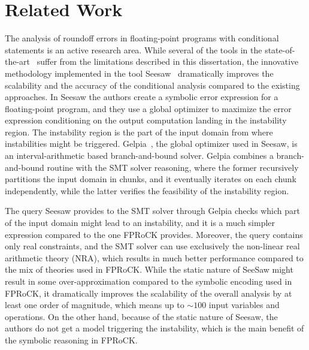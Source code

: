 \chapter{Related Work}
\setupuuchapterbib
%
The analysis of roundoff errors in floating-point programs with conditional statements is an active research area.
%
While several of the tools in the state-of-the-art~\cite{darulova2018daisy, precisa, fluctuat} suffer from the limitations described in this dissertation, the innovative methodology implemented in the tool Seesaw~\cite{seesaw} dramatically improves the scalability and the accuracy of the conditional analysis compared to the existing approaches.
%
In Seesaw the authors create a symbolic error expression for a floating-point program, and they use a global optimizer to maximize the error expression conditioning on the output computation landing in the instability region.
%
The instability region is the part of the input domain from where instabilities might be triggered.
%
Gelpia~\cite{gelpia}, the global optimizer used in Seesaw, is an interval-arithmetic based branch-and-bound solver. 
%
Gelpia combines a branch-and-bound routine with the SMT solver reasoning, where the former recursively partitions the input domain in chunks, and it eventually iterates on each chunk independently, while the latter verifies the feasibility of the instability region. 
%

The query Seesaw provides to the SMT solver through Gelpia checks which part of the input domain might lead to an instability, and it is a much simpler expression compared to the one FPRoCK provides.
%
Moreover, the query contains only real constraints, and the SMT solver can use exclusively the non-linear real arithmetic theory (NRA), which results in much better performance compared to the mix of theories used in FPRoCK.
%
While the static nature of SeeSaw might result in some over-approximation compared to the symbolic encoding used in FPRoCK, it dramatically improves the scalability of the overall analysis by at least one order of magnitude, which means up to $\sim100$ input variables and operations.
%
On the other hand, because of the static nature of Seesaw, the authors do not get a model triggering the instability, which is the main benefit of the symbolic reasoning in FPRoCK.
%
%
%
%
%
%
%
%
%
%

